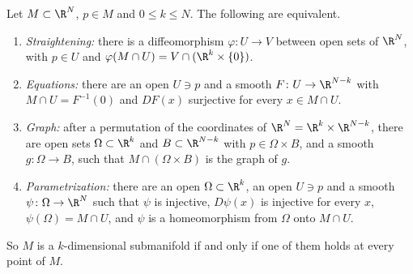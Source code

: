 \begin{theorem}\label{thm:fourdesc}
Let $M\subset\R^N$, $p\in M$ and $0\le k\le N$. The following are equivalent.
\begin{enumerate}[label=(\alph*)]
\item \emph{Straightening:} there is a diffeomorphism $\varphi\colon U\to V$ between open sets of $\R^N$, with $p\in U$ and
$\varphi(M\cap U)=V\cap(\R^k\times\{0\})$.
\item \emph{Equations:} there are an open $U\ni p$ and a smooth $F\colon U\to\R^{N-k}$ with $M\cap U=F^{-1}(0)$ and $DF(x)$ surjective for every
$x\in M\cap U$.
\item \emph{Graph:} after a permutation of the coordinates of $\R^N=\R^k\times\R^{N-k}$, there are open sets $\Omega\subset\R^k$ and $B\subset\R^{N-k}$ with
$p\in\Omega\times B$, and a smooth $g\colon\Omega\to B$, such that $M\cap(\Omega\times B)$ is the graph of $g$.
\item \emph{Parametrization:} there are an open $\Omega\subset\R^k$, an open $U\ni p$ and a smooth $\psi\colon\Omega\to\R^N$ such that $\psi$ is injective,
$D\psi(x)$ is injective for every $x$, $\psi(\Omega)=M\cap U$, and $\psi$ is a homeomorphism from $\Omega$ onto $M\cap U$.
\end{enumerate}
So $M$ is a $k$-dimensional submanifold if and only if one of them holds at every point of $M$.
\end{theorem}

